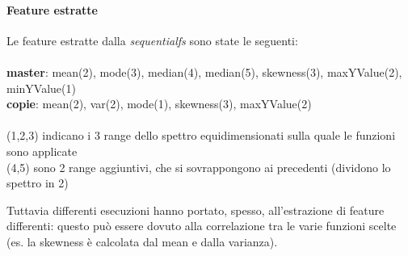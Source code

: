 \paragraph{Feature estratte}
Le feature estratte dalla \textit{sequentialfs} sono state le seguenti:
\\\\
\textbf{master}: mean(2), mode(3), median(4), median(5), skewness(3), maxYValue(2), minYValue(1)
\\
\textbf{copie}: mean(2), var(2), mode(1), skewness(3), maxYValue(2)
\\\\(1,2,3) indicano i 3 range dello spettro equidimensionati sulla quale le funzioni sono applicate
\\(4,5) sono 2 range aggiuntivi, che si sovrappongono ai precedenti (dividono lo spettro in 2)

Tuttavia differenti esecuzioni hanno portato, spesso, all'estrazione di feature differenti: questo può essere dovuto alla correlazione tra le varie funzioni scelte (es. la skewness è calcolata dal mean e dalla varianza).